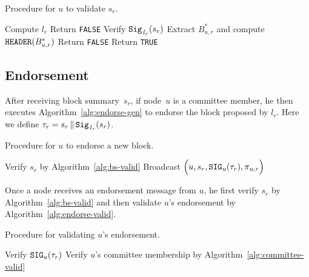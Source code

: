 \documentclass{article}
\begin{document}
\begin{algorithm}[H]
\caption{Procedure for $u$ to validate $s_r$.}
\label{alg:bs-valid}
\begin{spacing}{1.2}
\begin{algorithmic}[1]
    \vspace{1ex}
    \State Compute $l_r$
        \State Return {\tt FALSE}
    \EndIf
    \vspace{1ex}
    \State Verify ${\tt Sig}_{\,l_r}(s_r)$
    \vspace{1ex}
    \State Extract $B_{u,r}^*$ and compute ${\tt HEADER}(B_{u,r}^*)$
        \State Return {\tt FALSE}
    \EndIf
    \vspace{1ex}
    \State Return {\tt TRUE}
\end{algorithmic}
\end{spacing}
\end{algorithm}

\subsection{Endorsement}

After receiving block summary~$s_r$, if node~$u$ is a committee member, he then executes Algorithm~\ref{alg:endorse-gen} to endorse the block proposed by $l_r$. Here we define $\tau_r=s_r\,\|\,{\tt Sig}_{\,l_r}(s_r)$.

\begin{algorithm}[H]
\caption{Procedure for $u$ to endorse a new block.}
\label{alg:endorse-gen}
\begin{spacing}{1.2}
\begin{algorithmic}[1]
    \vspace{1ex}
    \State Verify $s_r$ by Algorithm~\ref{alg:bs-valid}
    \State Broadcast $\Big(u,s_r,{\tt SIG}_u(\tau_r),\pi_{u,r}\Big)$
\end{algorithmic}
\end{spacing}
\end{algorithm}

Once a node receives an endorsement message from $u$, he first verify $s_r$ by Algorithm~\ref{alg:bs-valid} and then validate $u$'s endorsement by Algorithm~\ref{alg:endorse-valid}.

\begin{algorithm}[H]
\caption{Procedure for validating $u$'s endorsement.}
\label{alg:endorse-valid}
\begin{spacing}{1.2}
\begin{algorithmic}[1]
    \vspace{1ex}
    \State Verify ${\tt SIG}_{u}(\tau_r)$
    \State Verify $u$'s committee membership by Algorithm~\ref{alg:committee-valid}
\end{algorithmic}
\end{spacing}
\end{algorithm}
\end{document}
